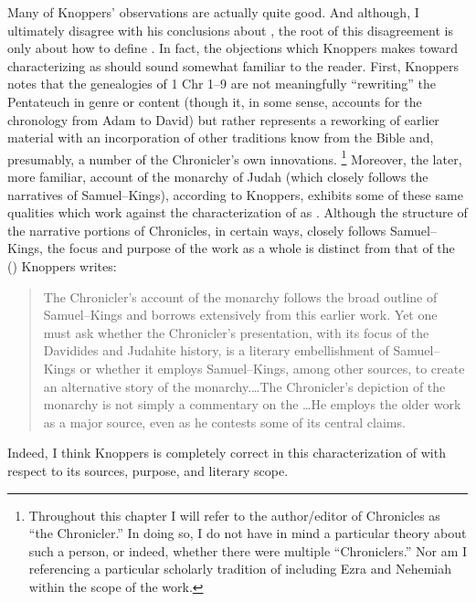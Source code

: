 Many of Knoppers' observations are actually quite good. And although, I ultimately disagree with his conclusions about \chronicles \visavis \rwb, the root of this disagreement is only about how to define \rwb. In fact, the objections which Knoppers makes toward characterizing \chronicles as \rwb should sound somewhat familiar to the reader. First, Knoppers notes that the genealogies of 1 Chr 1--9 are not meaningfully ``rewriting'' the Pentateuch in genre or content (though it, in some sense, accounts for the chronology from Adam to David) but rather represents a reworking of earlier material with an incorporation of other traditions know from the Bible and, presumably, a number of the Chronicler's own innovations.%
    \footnote{Throughout this chapter I will refer to the author/editor of Chronicles as ``the Chronicler.'' In doing so, I do not have in mind a particular theory about such a person, or indeed, whether there were multiple ``Chroniclers.'' Nor am I referencing a particular scholarly tradition of including Ezra and Nehemiah within the scope of the work.}
Moreover, the later, more familiar, account of the monarchy of Judah (which closely follows the narratives of Samuel--Kings), according to Knoppers, exhibits some of these same qualities which work against the characterization of \chronicles as \rwb. Although the structure of the narrative portions of Chronicles, in certain ways, closely follows Samuel--Kings, the focus and purpose of the work as a whole is distinct from that of the \DtrH (\drth)\autocite[132]{knoppers2003} Knoppers writes:

\begin{quote}
    The Chronicler's account of the monarchy follows the broad outline of Samuel--Kings and borrows extensively from this earlier work. Yet one must ask whether the Chronicler's presentation, with its focus of the Davidides and Judahite history, is a literary embellishment of Samuel--Kings or whether it employs Samuel--Kings, among other sources, to create an alternative story of the monarchy.\dots The Chronicler's depiction of the monarchy is not simply a commentary on the \DtrH\dots He employs the older work as a major source, even as he contests some of its central claims.\autocite[132--33]{knoppers2003}
\end{quote}
\noindent
Indeed, I think Knoppers is completely correct in this characterization of \chronicles with respect to its sources, purpose, and literary scope.


